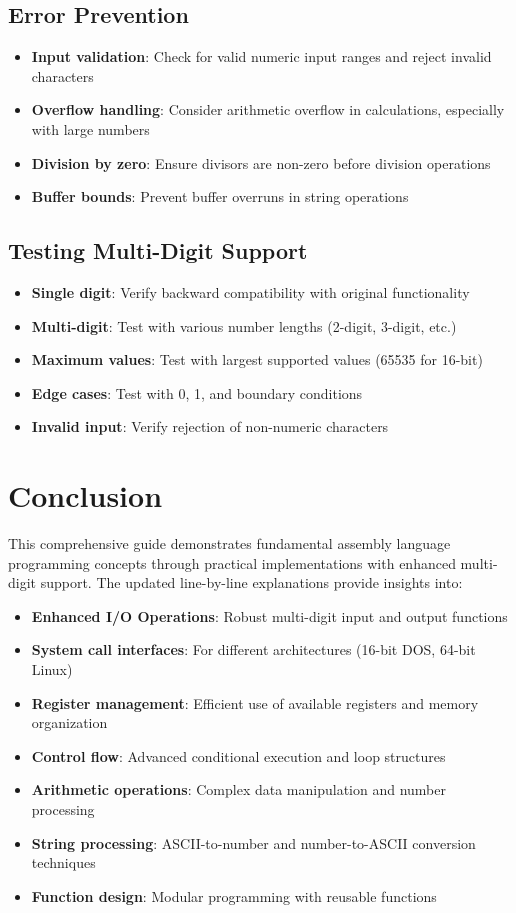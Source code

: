 \documentclass[12pt,a4paper]{article}
\begin{document}
\subsection{Error Prevention}
\begin{itemize}
\item \textbf{Input validation}: Check for valid numeric input ranges and reject invalid characters
\item \textbf{Overflow handling}: Consider arithmetic overflow in calculations, especially with large numbers
\item \textbf{Division by zero}: Ensure divisors are non-zero before division operations
\item \textbf{Buffer bounds}: Prevent buffer overruns in string operations
\end{itemize}

\subsection{Testing Multi-Digit Support}
\begin{itemize}
\item \textbf{Single digit}: Verify backward compatibility with original functionality
\item \textbf{Multi-digit}: Test with various number lengths (2-digit, 3-digit, etc.)
\item \textbf{Maximum values}: Test with largest supported values (65535 for 16-bit)
\item \textbf{Edge cases}: Test with 0, 1, and boundary conditions
\item \textbf{Invalid input}: Verify rejection of non-numeric characters
\end{itemize}

\section{Conclusion}

This comprehensive guide demonstrates fundamental assembly language programming concepts through practical implementations with enhanced multi-digit support. The updated line-by-line explanations provide insights into:

\begin{itemize}
\item \textbf{Enhanced I/O Operations}: Robust multi-digit input and output functions
\item \textbf{System call interfaces}: For different architectures (16-bit DOS, 64-bit Linux)
\item \textbf{Register management}: Efficient use of available registers and memory organization
\item \textbf{Control flow}: Advanced conditional execution and loop structures
\item \textbf{Arithmetic operations}: Complex data manipulation and number processing
\item \textbf{String processing}: ASCII-to-number and number-to-ASCII conversion techniques
\item \textbf{Function design}: Modular programming with reusable functions
\end{itemize}
\end{document}
